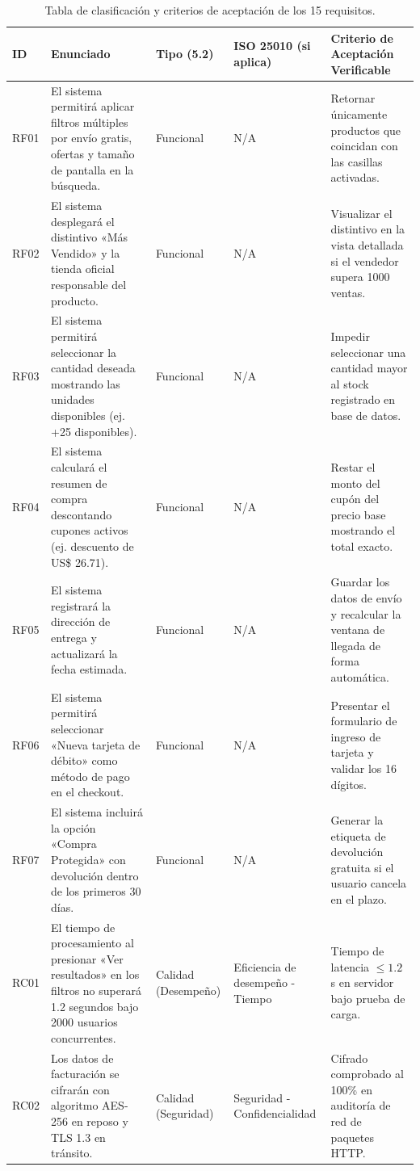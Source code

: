 \documentclass[11pt, a4paper]{article}
\begin{document}
\small
\begin{longtable}{p{} p{} p{} p{} p{}}
\caption{Tabla de clasificación y criterios de aceptación de los 15 requisitos.} \label{tab:requisitos} \\
\toprule
\textbf{ID} & \textbf{Enunciado} & \textbf{Tipo (5.2)} & \textbf{ISO 25010 (si aplica)} & \textbf{Criterio de Aceptación Verificable} \\
\midrule
\endhead
\bottomrule
\endfoot
RF01 & El sistema permitirá aplicar filtros múltiples por envío gratis, ofertas y tamaño de pantalla en la búsqueda. & Funcional & N/A & Retornar únicamente productos que coincidan con las casillas activadas. \\
RF02 & El sistema desplegará el distintivo «Más Vendido» y la tienda oficial responsable del producto. & Funcional & N/A & Visualizar el distintivo en la vista detallada si el vendedor supera 1000 ventas. \\
RF03 & El sistema permitirá seleccionar la cantidad deseada mostrando las unidades disponibles (ej. +25 disponibles). & Funcional & N/A & Impedir seleccionar una cantidad mayor al stock registrado en base de datos. \\
RF04 & El sistema calculará el resumen de compra descontando cupones activos (ej. descuento de US\$ 26.71). & Funcional & N/A & Restar el monto del cupón del precio base mostrando el total exacto. \\
RF05 & El sistema registrará la dirección de entrega y actualizará la fecha estimada. & Funcional & N/A & Guardar los datos de envío y recalcular la ventana de llegada de forma automática. \\
RF06 & El sistema permitirá seleccionar «Nueva tarjeta de débito» como método de pago en el checkout. & Funcional & N/A & Presentar el formulario de ingreso de tarjeta y validar los 16 dígitos. \\
RF07 & El sistema incluirá la opción «Compra Protegida» con devolución dentro de los primeros 30 días. & Funcional & N/A & Generar la etiqueta de devolución gratuita si el usuario cancela en el plazo. \\
RC01 & El tiempo de procesamiento al presionar «Ver resultados» en los filtros no superará 1.2 segundos bajo 2000 usuarios concurrentes. & Calidad (Desempeño) & Eficiencia de desempeño - Tiempo & Tiempo de latencia $\le 1.2$ s en servidor bajo prueba de carga. \\
RC02 & Los datos de facturación se cifrarán con algoritmo AES-256 en reposo y TLS 1.3 en tránsito. & Calidad (Seguridad) & Seguridad - Confidencialidad & Cifrado comprobado al 100\% en auditoría de red de paquetes HTTP. \\

\end{longtable}
\end{document}
